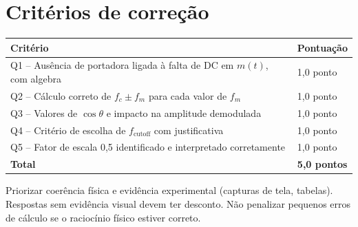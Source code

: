 \documentclass[11pt,a4paper]{article}
\begin{document}
\section*{Critérios de correção}
\begin{tabular}{ll}
  \toprule
  Critério & Pontuação \\
  \midrule
  Q1 -- Ausência de portadora ligada à falta de DC em $m(t)$, com algebra & 1,0 ponto \\
  Q2 -- Cálculo correto de $f_c \pm f_m$ para cada valor de $f_m$         & 1,0 ponto \\
  Q3 -- Valores de $\cos\theta$ e impacto na amplitude demodulada          & 1,0 ponto \\
  Q4 -- Critério de escolha de $f_\text{cutoff}$ com justificativa         & 1,0 ponto \\
  Q5 -- Fator de escala 0,5 identificado e interpretado corretamente       & 1,0 ponto \\
  \midrule
  \textbf{Total} & \textbf{5,0 pontos} \\
  \bottomrule
\end{tabular}

\bigskip
\begin{nota}
  Priorizar coerência física e evidência experimental (capturas de tela, tabelas).
  Respostas sem evidência visual devem ter desconto. Não penalizar pequenos erros
  de cálculo se o raciocínio físico estiver correto.
\end{nota}
\end{document}
